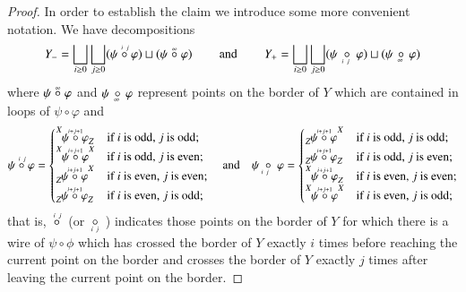 \documentclass{amsart}
\def\tn{\textnormal}
\def\hsp{\hspace{.3in}}
\newcommand{\inp}[1]{{#1_-}}
\newcommand{\outp}[1]{{#1_+}}
\newcommand{\feeddd}[3]{{\tensor*[^{#2}_{\color{white}{!}}]{{#1}}{^{#3}}}}%
\newcommand{\feeddc}[3]{{\tensor*[^{#2}]{{#1}}{_{#3}}}}
\newcommand{\feedcd}[3]{{\tensor*[_{#2}]{{#1}}{^{#3}}}}
\newcommand{\feedcc}[3]{{\tensor*[^{\color{white}{!}}_{#2}]{{#1}}{_{#3}}}}
\theoremstyle{remark}
\theoremstyle{definition}
\begin{document}
\begin{proof}
In order to establish the claim we introduce some more convenient notation.  We have decompositions
\[\inp{Y}=\bigsqcup_{i\ge0}\bigsqcup_{j\ge0}(\psi\;\accentset{\,i\ j}{\circ}\;\varphi)\sqcup(\psi\;\accentset{\infty}{\circ}\;\varphi)\hsp\tn{and}\hsp \outp{Y}=\bigsqcup_{i\ge0}\bigsqcup_{j\ge0}(\psi\;\underaccent{\,\ i\ j}{\circ}\;\varphi)\sqcup(\psi\,\underaccent{\;\ \infty}{\circ}\,\varphi)\]
where $\psi\;\accentset{\infty}{\circ}\;\varphi$ and $\psi\,\underaccent{\ \;\infty}{\circ}\,\varphi$ represent points on the border of $Y$ which are contained in loops of $\psi\circ\varphi$ and
\[\psi\;\accentset{\,i\ j}{\circ}\;\varphi=\begin{cases}\feeddc{\psi\;\accentset{i+j+1}{\circ}\;\varphi}{X}{Z} & \text{if $i$ is odd, $j$ is odd;}\\\feeddd{\psi\;\accentset{i+j+1}{\circ}\;\varphi}{X}{X} & \text{if $i$ is odd, $j$ is even;}\\\feedcd{\psi\;\accentset{i+j+1}{\circ}\;\varphi}{Z}{X} & \text{if $i$ is even, $j$ is even;}\\\feedcc{\psi\;\accentset{i+j+1}{\circ}\;\varphi}{Z}{Z} & \text{if $i$ is even, $j$ is odd;}\end{cases}
\quad\tn{and}\quad
\psi\;\underaccent{i\ j}{\circ}\;\varphi=\begin{cases}\feedcd{\psi\;\accentset{i+j+1}{\circ}\;\varphi}{Z}{X} & \text{if $i$ is odd, $j$ is odd;}\\\feedcc{\psi\;\accentset{i+j+1}{\circ}\;\varphi}{Z}{Z} & \text{if $i$ is odd, $j$ is even;}\\\feeddc{\psi\;\accentset{i+j+1}{\circ}\;\varphi}{X}{Z} & \text{if $i$ is even, $j$ is even;}\\\feeddd{\psi\;\accentset{i+j+1}{\circ}\;\varphi}{X}{X} & \text{if $i$ is even, $j$ is odd;}\end{cases}\]
that is, $\ \accentset{\,i\ j}{\circ}\ $ (or $\ \underaccent{\,i\ j}{\circ}\,$ ) indicates those points on the border of $Y$ for which there is a wire of $\psi\circ\phi$ which has crossed the border of $Y$ exactly $i$ times before reaching the current point on the border and crosses the border of $Y$ exactly $j$ times after leaving the current point on the border.


\end{proof}
\end{document}
